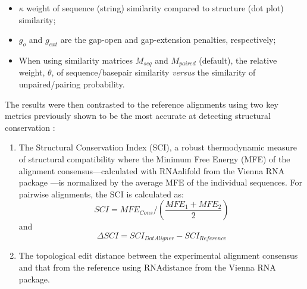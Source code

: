 \documentclass[a4paper,twoside]{article}
\begin{document}
\begin{itemize}
	\item $\kappa$ weight of sequence (string) similarity compared to structure 
	(dot plot) similarity;
	\item $g_o$ and $g_{ext}$ are the gap-open and gap-extension penalties, 
	respectively;
	\item When using similarity matrices $M_{seq}$ and $M_{paired}$ (default), 
	the relative weight, $\theta$, of sequence/basepair similarity \textit{versus} 
	the similarity of unpaired/pairing probability.
\end{itemize}

\noindent The results were then contrasted to  the reference alignments 
using two key metrics previously shown to be the most accurate at detecting 
structural conservation \cite{gruber2008strategies}: 
 \begin{enumerate}
\item  The Structural Conservation Index (SCI), a robust thermodynamic measure 
of structural compatibility where the Minimum Free Energy (MFE) of the alignment 
consensus---calculated with RNAalifold from the Vienna RNA package 
\cite{lorenz2011viennarna}---is normalized by the average MFE of the individual 
sequences. For pairwise alignments, the SCI is calculated as:
\begin{equation}\label{sci}
	SCI =  MFE_{Cons} /  \left( \frac{ MFE_1 + MFE_2 }{ 2} \right)   
\end{equation} 
and 	
\begin{equation}\label{dsci}
	\Delta SCI =  SCI_{DotAligner} - SCI_{Reference}
\end{equation} 
 \item  The topological edit distance between the experimental alignment consensus 
 and that from the reference using RNAdistance from the Vienna RNA package. 
 \end{enumerate}
\end{document}

